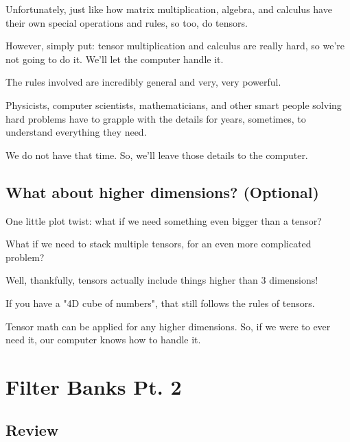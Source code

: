         Unfortunately, just like how matrix multiplication, algebra, and calculus have their own special operations and rules, so too, do tensors.
        
        However, simply put: tensor multiplication and calculus are really hard, so we're not going to do it. We'll let the computer handle it.
        
        The rules involved are incredibly general and very, very powerful.
        
        Physicists, computer scientists, mathematicians, and other smart people solving hard problems have to grapple with the details for years, sometimes, to understand everything they need.
        
        We do not have that time. So, we'll leave those details to the computer.
        
    \subsection{What about higher dimensions? (Optional)}
    
        One little plot twist: what if we need something even bigger than a tensor?
        
        What if we need to stack multiple tensors, for an even more complicated problem?
        
        Well, thankfully, tensors actually include things higher than 3 dimensions!
        
        If you have a "4D cube of numbers", that still follows the rules of tensors.
        
        Tensor math can be applied for any higher dimensions. So, if we were to ever need it, our computer knows how to handle it.
        
        
        
        
        
        
        
        
        
        
        
\section{Filter Banks Pt. 2}

    \subsection{Review}

